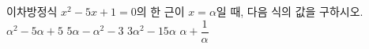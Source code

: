 이차방정식 $x^2-5x+1=0$의 한 근이 $x=\alpha$일 때, 다음 식의 값을 구하시오.
 $\alpha^2-5\alpha+5$
 $5\alpha-\alpha^2-3$
 $3\alpha^2-15\alpha$
 $\alpha+\dfrac{1}{\alpha}$
